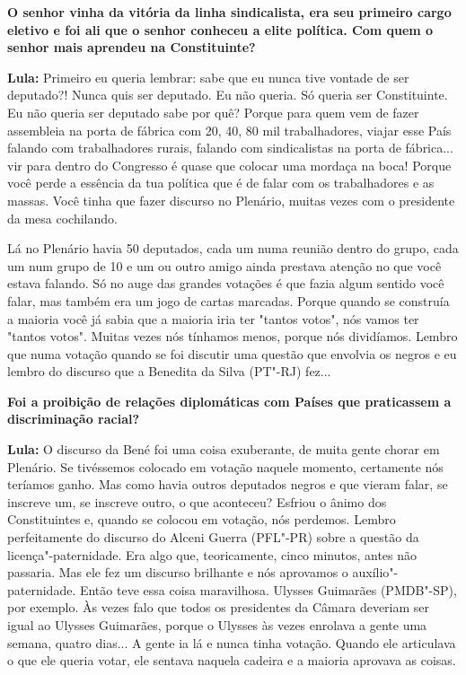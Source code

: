 \textbf{O senhor vinha da vitória da linha sindicalista, era seu
primeiro cargo eletivo e foi ali que o senhor conheceu a elite política.
Com quem o senhor mais aprendeu na Constituinte?}

\textbf{Lula:} Primeiro eu queria lembrar: sabe que eu nunca tive
vontade de ser deputado?! Nunca quis ser deputado. Eu não queria. Só
queria ser Constituinte. Eu não queria ser deputado sabe por quê? Porque
para quem vem de fazer assembleia na porta de fábrica com 20, 40, 80 mil
trabalhadores, viajar esse País falando com trabalhadores rurais,
falando com sindicalistas na porta de fábrica... vir para dentro do
Congresso é quase que colocar uma mordaça na boca! Porque você perde a
essência da tua política que é de falar com os trabalhadores e as
massas. Você tinha que fazer discurso no Plenário, muitas vezes com o
presidente da mesa cochilando.

Lá no Plenário havia 50 deputados, cada um numa reunião dentro do grupo,
cada um num grupo de 10 e um ou outro amigo ainda prestava atenção no
que você estava falando. Só no auge das grandes votações é que fazia
algum sentido você falar, mas também era um jogo de cartas marcadas.
Porque quando se construía a maioria você já sabia que a maioria iria
ter "tantos votos", nós vamos ter "tantos votos". Muitas vezes nós
tínhamos menos, porque nós dividíamos. Lembro que numa votação quando se
foi discutir uma questão que envolvia os negros e eu lembro do discurso
que a Benedita da Silva (PT"-RJ) fez...

\textbf{Foi a proibição de relações diplomáticas com Países que
praticassem a discriminação racial?}

\textbf{Lula:} O discurso da Bené foi uma coisa exuberante, de muita
gente chorar em Plenário. Se tivéssemos colocado em votação naquele
momento, certamente nós teríamos ganho. Mas como havia outros deputados
negros e que vieram falar, se inscreve um, se inscreve outro, o que
aconteceu? Esfriou o ânimo dos Constituintes e, quando se colocou em
votação, nós perdemos. Lembro perfeitamente do discurso do Alceni Guerra
(PFL"-PR) sobre a questão da licença"-paternidade. Era algo que,
teoricamente, cinco minutos, antes não passaria. Mas ele fez um discurso
brilhante e nós aprovamos o auxílio"-paternidade. Então teve essa coisa
maravilhosa. Ulysses Guimarães (PMDB"-SP), por exemplo. Às vezes falo que
todos os presidentes da Câmara deveriam ser igual ao Ulysses Guimarães,
porque o Ulysses às vezes enrolava a gente uma semana, quatro dias... A
gente ia lá e nunca tinha votação. Quando ele articulava o que ele
queria votar, ele sentava naquela cadeira e a maioria aprovava as
coisas.

